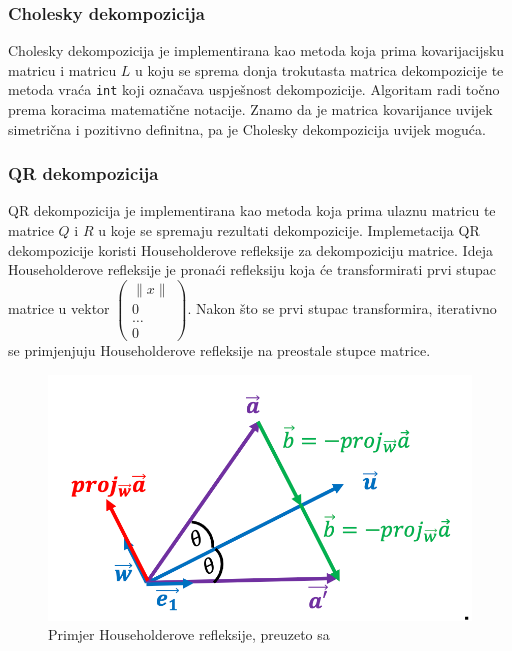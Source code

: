 \documentclass[zavrsnirad, upload]{fer}
\begin{document}
\subsubsection{Cholesky dekompozicija}
\label{sek:cholesky_dekompozicija}
Cholesky dekompozicija je implementirana
kao metoda koja prima kovarijacijsku matricu i matricu $L$ u koju se sprema
donja trokutasta matrica dekompozicije te metoda vraća \texttt{int} koji
označava uspješnost dekompozicije.
Algoritam radi točno prema koracima matematične notacije.
Znamo da je matrica kovarijance uvijek simetrična i
pozitivno definitna, pa je Cholesky dekompozicija uvijek moguća.

\subsubsection{QR dekompozicija}
\label{sek:qr_dekompozicija}
QR dekompozicija je implementirana kao metoda koja prima ulaznu matricu
te matrice $Q$ i $R$ u koje se spremaju rezultati dekompozicije.
Implemetacija QR dekompozicije koristi Householderove refleksije za
dekompoziciju matrice. Ideja Householderove refleksije je pronaći
refleksiju koja će transformirati prvi stupac matrice u vektor
$\begin{pmatrix} \|x\| \\ 0 \\ \dots \\ 0 \end{pmatrix}$.
Nakon što se prvi stupac transformira, iterativno se primjenjuju
Householderove refleksije na preostale stupce matrice.

\begin{figure}[H]
    \centering
    \includegraphics[width=1.0\textwidth]{Figures/householder.png}
    \caption{Primjer Householderove refleksije, preuzeto sa \cite{HouseholderSketch}}
    \label{fig:householder}
\end{figure}
\end{document}
